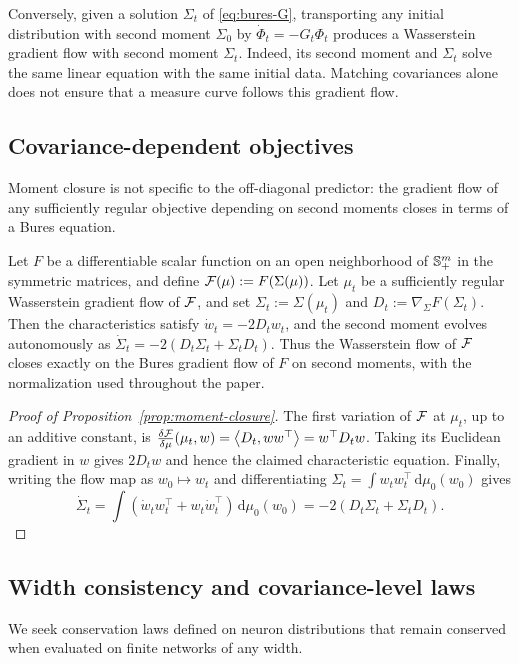 Conversely, given a solution $\Sigma_t$ of \eqref{eq:bures-G}, transporting
any initial distribution with second moment $\Sigma_0$ by
$\dot\Phi_t=-G_t\Phi_t$ produces a Wasserstein gradient flow with second
moment $\Sigma_t$. Indeed, its second moment and $\Sigma_t$ solve the same
linear equation with the same initial data. Matching covariances alone
does not ensure that a measure curve follows this gradient flow.

\subsection{Covariance-dependent objectives}
Moment closure is not specific to the off-diagonal predictor:
the gradient flow of any sufficiently regular objective depending on second moments closes in terms of a Bures equation.
\begin{proposition}
\label{prop:moment-closure}
Let $F$ be a differentiable scalar function on an open neighborhood of
$\mathbb{S}_{+}^m$ in the symmetric matrices, and define $\mathcal F(\mu):=F(\Sigma(\mu))$.
Let $\mu_t$ be a sufficiently regular Wasserstein gradient flow of $\mathcal F$, and set $\Sigma_t:=\Sigma(\mu_t)$ and $D_t:=\nabla_\Sigma F(\Sigma_t)$.
Then the characteristics satisfy \(\dot w_t=-2D_tw_t\), and the second moment evolves autonomously as
\(\dot\Sigma_t=-2(D_t\Sigma_t+\Sigma_tD_t)\).
Thus the Wasserstein flow of $\mathcal F$ closes exactly on the Bures gradient flow of $F$ on second moments, with the normalization used throughout the paper.
\end{proposition}

\begin{proof}[Proof of Proposition~\ref{prop:moment-closure}]
The first variation of $\mathcal F$ at $\mu_t$, up to an additive constant, is
$\frac{\delta\mathcal F}{\delta\mu}(\mu_t,w)=\left\langle D_t,ww^\top \right\rangle=w^\top D_tw$.
Taking its Euclidean gradient in $w$ gives $2D_tw$ and hence the claimed characteristic equation.
Finally, writing the flow map as $w_0 \mapsto w_t$ and differentiating $\Sigma_t=\int w_tw_t^\top\,\mathrm{d}\mu_0(w_0)$ gives
\[
\dot\Sigma_t=\int \left(\dot w_tw_t^\top+w_t\dot w_t^\top\right)\,\mathrm{d}\mu_0(w_0)=-2(D_t\Sigma_t+\Sigma_tD_t).
\]
\end{proof}


\subsection{Width consistency and covariance-level laws}
We seek conservation laws defined on neuron distributions that remain
conserved when evaluated on finite networks of any width.

